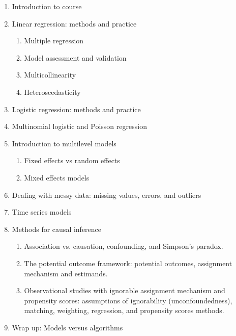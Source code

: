 \documentclass[11pt]{article}
\begin{document}
\begin{enumerate}
	\item Introduction to course
	\item Linear regression: methods and practice
	\begin{enumerate}
		\item Multiple regression
		\item Model assessment and validation
		\item Multicollinearity
		\item Heteroscedasticity
	\end{enumerate}
	\item Logistic regression: methods and practice
	\item Multinomial logistic and Poisson regression
	\item Introduction to multilevel models
	\begin{enumerate}
		\item Fixed effects vs random effects
		\item Mixed effects models
	\end{enumerate}
	\item Dealing with messy data: missing values, errors, and outliers
	\item Time series models
	\item Methods for causal inference
	\begin{enumerate}
		\item Association vs. causation, confounding, and Simpson's paradox.
		\item The potential outcome framework: potential outcomes, assignment mechanism and estimands.
		\item Observational studies with ignorable assignment mechanism and propensity scores: assumptions of ignorability (unconfoundedness), matching, weighting, regression, and propensity scores methods. 
	\end{enumerate}
	\item Wrap up: Models versus algorithms
	
	
	

\end{enumerate}
\end{document}
